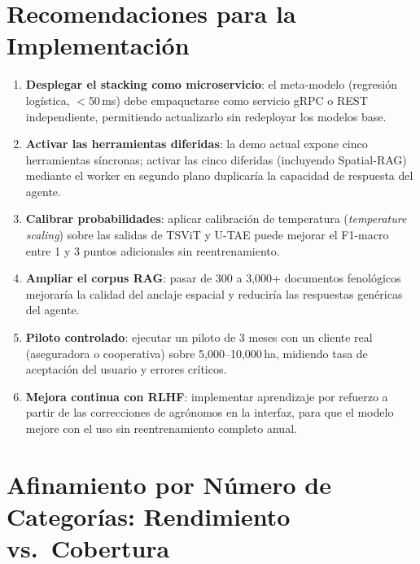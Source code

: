 \documentclass{article}
\begin{document}
\section{Recomendaciones para la Implementación}

\begin{enumerate}[leftmargin=*]
    \item \textbf{Desplegar el stacking como microservicio}: el meta-modelo
    (regresión logística, $<$50\,ms) debe empaquetarse como servicio gRPC
    o REST independiente, permitiendo actualizarlo sin redeployar los
    modelos base.

    \item \textbf{Activar las herramientas diferidas}: la demo actual expone
    cinco herramientas síncronas; activar las cinco diferidas (incluyendo
    Spatial-RAG) mediante el worker en segundo plano duplicaría la capacidad
    de respuesta del agente.

    \item \textbf{Calibrar probabilidades}: aplicar calibración de
    temperatura (\textit{temperature scaling}) sobre las salidas de TSViT
    y U-TAE puede mejorar el F1-macro entre 1 y 3 puntos adicionales sin
    reentrenamiento.

    \item \textbf{Ampliar el corpus RAG}: pasar de 300 a 3,000+ documentos
    fenológicos mejoraría la calidad del anclaje espacial y reduciría las
    respuestas genéricas del agente.

    \item \textbf{Piloto controlado}: ejecutar un piloto de 3 meses con un
    cliente real (aseguradora o cooperativa) sobre 5,000--10,000\,ha,
    midiendo tasa de aceptación del usuario y errores críticos.

    \item \textbf{Mejora continua con RLHF}: implementar aprendizaje por
    refuerzo a partir de las correcciones de agrónomos en la interfaz, para
    que el modelo mejore con el uso sin reentrenamiento completo anual.
\end{enumerate}

\section{Afinamiento por Número de Categorías: Rendimiento vs.\ Cobertura}
\end{document}
